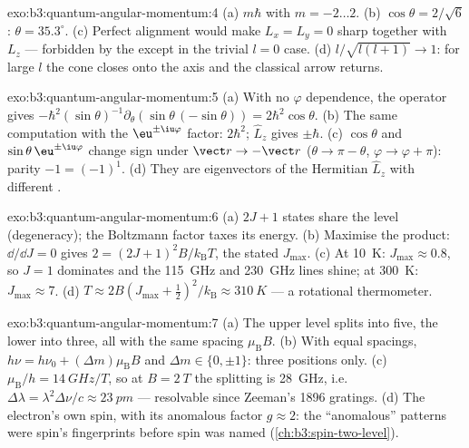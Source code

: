 \begin{solution}{exo:b3:quantum-angular-momentum:4}
(a) $m\hbar$ with $m = -2 \dots 2$. (b) $\cos\theta = 2/\sqrt6$:
$\theta = 35.3^\circ$. (c) Perfect alignment would make $L_x = L_y
= 0$ sharp together with $L_z$ --- forbidden by the 
except in the trivial $l = 0$ case. (d) $l/\sqrt{l(l+1)} \to 1$: for
large $l$ the cone closes onto the axis and the classical arrow
returns.
\end{solution}

\begin{solution}{exo:b3:quantum-angular-momentum:5}
(a) With no $\varphi$ dependence, the operator gives
$-\hbar^2(\sin\theta)^{-1}\partial_\theta(\sin\theta\,(-\sin\theta))
= 2\hbar^2\cos\theta$. (b) The same computation with the
$\eu^{\pm\iu\varphi}$ factor:  $2\hbar^2$; $\hat L_z$
gives $\pm\hbar$. (c) $\cos\theta$ and $\sin\theta\,\eu^{\pm\iu
\varphi}$ change sign under $\vect r \to -\vect r$ ($\theta \to \pi
- \theta$, $\varphi \to \varphi + \pi$): parity $-1 = (-1)^1$. (d)
They are eigenvectors of the Hermitian $\hat L_z$ with different
.
\end{solution}

\begin{solution}{exo:b3:quantum-angular-momentum:6}
(a) $2J + 1$ states share the level (degeneracy); the Boltzmann
factor taxes its energy. (b) Maximise the product: $\dd/\dd J = 0$
gives $2 = (2J+1)^2B/k_{\text{B}}T$, the stated $J_{\max}$. (c) At
\qty{10}{K}: $J_{\max} \approx 0.8$, so $J = 1$ dominates and the
\qty{115}{GHz} and \qty{230}{GHz} lines shine; at \qty{300}{K}:
$J_{\max} \approx 7$. (d) $T \approx 2B(J_{\max} + \tfrac12)^2/
k_{\text{B}} \approx \qty{310}{K}$ --- a rotational thermometer.
\end{solution}

\begin{solution}{exo:b3:quantum-angular-momentum:7}
(a) The upper level splits into five, the lower into three, all
with the same spacing $\mu_{\text{B}}B$. (b) With equal spacings,
$h\nu = h\nu_0 + (\Delta m)\mu_{\text{B}}B$ and $\Delta m \in \{0,
\pm1\}$: three positions only. (c) $\mu_{\text{B}}/h = \qty{14}{GHz/T}$, so at $B = \qty{2}{T}$
the splitting is \qty{28}{GHz}, i.e.\ $\Delta\lambda =
\lambda^2\Delta\nu/c \approx \qty{23}{pm}$ --- resolvable since
Zeeman's 1896 gratings.
(d) The electron's own spin, with its anomalous factor $g \approx
2$: the ``anomalous'' patterns were spin's fingerprints before spin
was named (\cref{ch:b3:spin-two-level}).
\end{solution}


